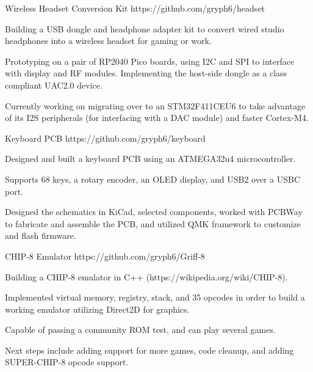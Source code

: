 
\begin{cventries}

  \cventry
    {Wireless Headset Conversion Kit} %
    {}
    {}
    {https://github.com/gryph6/headset}
    {
      \begin{cvitems} %
        \item {Building a USB dongle and headphone adapter kit to convert wired studio headphones into a wireless headset for gaming or work.} 
        \item {Prototyping on a pair of RP2040 Pico boards, using I2C and SPI to interface with display and RF modules. Implementing the host-side dongle as a class compliant UAC2.0 device.}
        \item {Currently working on migrating over to an STM32F411CEU6 to take advantage of its I2S peripherals (for interfacing with a DAC module) and faster Cortex-M4.} 
      \end{cvitems}
    }
  \cventry
    {Keyboard PCB} %
    {}
    {}
    {https://github.com/gryph6/keyboard}
    {
      \begin{cvitems} %
        \item {Designed and built a keyboard PCB using an ATMEGA32u4 microcontroller.} 
        \item {Supports 68 keys, a rotary encoder, an OLED display, and USB2 over a USBC port.}
        \item {Designed the schematics in KiCad, selected components, worked with PCBWay to fabricate and assemble the PCB, and utilized QMK framework to customize and flash firmware.}
      \end{cvitems}
    }
  \cventry
    {CHIP-8 Emulator} %
    {}
    {}
    {https://github.com/gryph6/Griff-8}
    {
      \begin{cvitems} %
      \item {Building a CHIP-8 emulator in C++ (https://wikipedia.org/wiki/CHIP-8).}
        \item{Implemented virtual memory, registry, stack, and 35 opcodes in order to build a working emulator utilizing Direct2D for graphics.}
        \item{Capable of passing a community ROM test, and can play several games.}
        \item {Next steps include adding support for more games, code cleanup, and adding SUPER-CHIP-8 opcode support.}
      \end{cvitems}
    }
\end{cventries}


